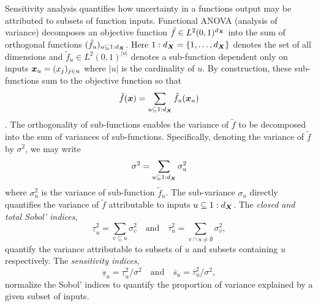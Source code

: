 \documentclass{article}[12pt]
\begin{document}
Sensitivity analysis quantifies how uncertainty in a functions output may be attributed to subsets of function inputs. Functional ANOVA (analysis of variance) decomposes an objective function $\tilde{f} \in L^2(0,1)^{d_{\boldsymbol{X}}}$ into the sum of orthogonal functions $(\tilde{f}_u)_{u \subseteq 1:d_{\boldsymbol{X}}}$. Here $1:d_{\boldsymbol{X}}=\{1,\dots,d_{\boldsymbol{X}}\}$ denotes the set of all dimensions and $\tilde{f}_u \in L^2(0,1)^{\lvert u \rvert}$ denotes a sub-function dependent only on inputs $\boldsymbol{x}_u = (x_j)_{j \in u}$ where $\lvert u \rvert$ is the cardinality of $u$. By construction, these sub-functions sum to the objective function so that
\begin{equation}
    \tilde{f}(\boldsymbol{x}) = \sum_{u \subseteq 1:d_{\boldsymbol{X}}} \tilde{f}_u(\boldsymbol{x}_u) \label{eq:fanova}
\end{equation}
\cite[Appendix A]{mcbook}. The orthogonality of sub-functions enables the variance of $\tilde{f}$ to be decomposed into the sum of variances of sub-functions. Specifically, denoting the variance of $\tilde{f}$ by $\sigma^2$, we may write
\begin{equation*}
    \sigma^2 = \sum_{u \subseteq 1:d_{\boldsymbol{X}}} \sigma^2_u
\end{equation*}
where $\sigma^2_u$ is the variance of sub-function $\tilde{f}_u$. The sub-variance $\sigma_u$ directly quantifies the variance of $\tilde{f}$ attributable to inputs $u \subseteq 1:d_{\boldsymbol{X}}$.  The \emph{closed and total Sobol' indices},
\begin{equation}
    \label{eq:sobol_indices}
    \underline{\tau}_u^2 = \sum_{v \subseteq u} \sigma^2_v \quad \text{and} \quad 
    \overline{\tau}_u^2 = \sum_{v \cap u \neq \emptyset} \sigma^2_v,
\end{equation}
quantify the variance attributable to subsets of $u$ and subsets containing $u$ respectively. The \emph{sensitivity indices},
\begin{equation}
    \label{eq:sensitivity_indices_og}
    \underline{s}_u = \underline{\tau}_u^2/\sigma^2 \quad \text{and} \quad 
    \overline{s}_u = \overline{\tau}_u^2/\sigma^2,
\end{equation}
normalize the Sobol' indices to quantify the proportion of variance explained by a given subset of inputs. 
\end{document}
